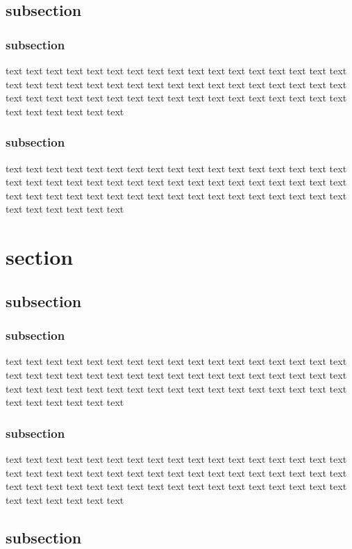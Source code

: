 \documentclass[report, backcover, english, nodocumentinfo]{upmethodology-document}
\begin{document}
			\subsection{subsection}
				\subsubsection{subsection}
						text text text text text text text text text text text text text text text text text text text text text text text text text text text text text text text text text text text text text text text text text text text text text text text text text text text text text text text text text
				\subsubsection{subsection}
						text text text text text text text text text text text text text text text text text text text text text text text text text text text text text text text text text text text text text text text text text text text text text text text text text text text text text text text text text
		\section{section}
			\subsection{subsection}
				\subsubsection{subsection}
						text text text text text text text text text text text text text text text text text text text text text text text text text text text text text text text text text text text text text text text text text text text text text text text text text text text text text text text text text
				\subsubsection{subsection}
						text text text text text text text text text text text text text text text text text text text text text text text text text text text text text text text text text text text text text text text text text text text text text text text text text text text text text text text text text
			\subsection{subsection}
\end{document}
